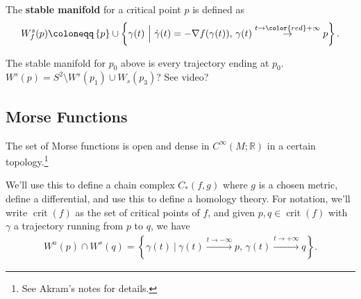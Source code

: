\begin{definition}

The \textbf{stable manifold} for a critical point \(p\) is defined as
\begin{align*}
W_f^s(p) \coloneqq\left\{{p}\right\} \cup\left\{{ \gamma(t) {~\mathrel{\Big|}~}\dot \gamma(t) = - \nabla f( \gamma(t) ),\, \gamma(t) \overset{t\to {\color{red} +} \infty}\to p }\right\}
.\end{align*}

\end{definition}

\begin{example}[?]

The stable manifold for \(p_0\) above is every trajectory ending at
\(p_0\). \(W^s(p) = S^2 \setminus W^s(p_1) \cup W_s(p_3)\)? See video?


\end{example}

\hypertarget{morse-functions}{%
\subsection{Morse Functions}\label{morse-functions}}

\begin{theorem}

The set of Morse functions is open and dense in
\(C^ \infty (M; {\mathbb{R}})\) in a certain topology.\footnote{See
  Akram's notes for details.}

\end{theorem}

\begin{remark}

We'll use this to define a chain complex \(C_*(f, g)\) where \(g\) is a
chosen metric, define a differential, and use this to define a homology
theory. For notation, we'll write \(\operatorname{crit}(f)\) as the set
of critical points of \(f\), and given
\(p, q\in \operatorname{crit}(f)\) with \(\gamma\) a trajectory running
from \(p\) to \(q\), we have
\begin{align*}
W^u(p) \cap W^s(q) = \left\{{ \gamma(t) {~\mathrel{\Big|}~}
\gamma(t) \overset{t\to -\infty }\to p,\,
\gamma(t) \overset{t\to +\infty }\to q
}\right\}
.\end{align*}

\end{remark}

